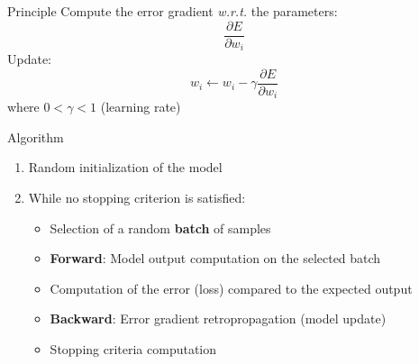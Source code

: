 
\begin{frame}{Principle}
  Compute the error gradient \emph{w.r.t.} the parameters:
  \[
  \frac{\partial{E}}{\partial{w_i}}
  \]
  Update:
  \[
  w_i \leftarrow w_i - \gamma\frac{\partial{E}}{\partial{w_i}}
  \]
  where $0 < \gamma < 1$ (learning rate)
\end{frame}

\begin{frame}{Algorithm}
  \begin{enumerate}[<+->]
    \item Random initialization of the model
    \item While no stopping criterion is satisfied:
      \begin{itemize}
        \item Selection of a random \textbf{batch} of samples
        \item \textbf{Forward}: Model output computation on the selected batch
        \item Computation of the error (loss) compared to the expected output
        \item \textbf{Backward}: Error gradient retropropagation (model update)
        \item Stopping criteria computation
      \end{itemize}
  \end{enumerate}
\end{frame}


